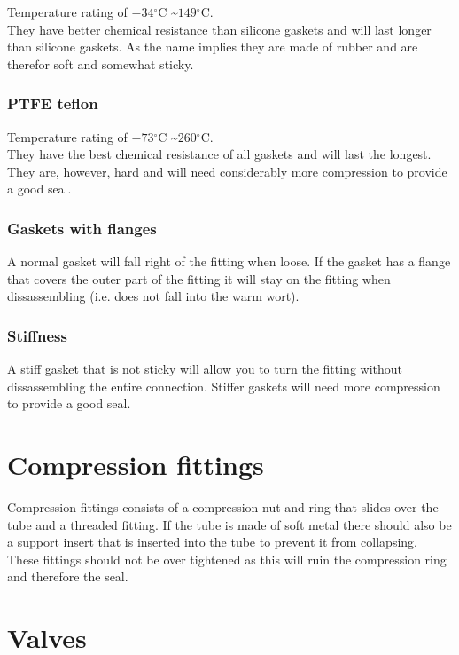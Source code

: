 \documentclass[11pt,fleqn]{book} %
\newcommand{\degree}{\ensuremath{^\circ}}
\begin{document}
Temperature rating of $-34\degree$C \textasciitilde $149\degree$C.\\
They have better chemical resistance than silicone gaskets and will last longer than silicone gaskets. As the name implies they are made of rubber and are therefor soft and somewhat sticky.

\subsubsection{PTFE teflon}

Temperature rating of $-73\degree$C \textasciitilde $260\degree$C.\\
They have the best chemical resistance of all gaskets and will last the longest. They are, however, hard and will need considerably more compression to provide a good seal.

\subsubsection{Gaskets with flanges}

A normal gasket will fall right of the fitting when loose. If the gasket has a flange that covers the outer part of the fitting it will stay on the fitting when dissassembling (i.e. does not fall into the warm wort).

\subsubsection{Stiffness}

A stiff gasket that is not sticky will allow you to turn the fitting without dissassembling the entire connection. Stiffer gaskets will need more compression to provide a good seal.

\section{Compression fittings}

Compression fittings consists of a compression nut and ring that slides over the tube and a threaded fitting. If the tube is made of soft metal there should also be a support insert that is inserted into the tube to prevent it from collapsing.\\
These fittings should not be over tightened as this will ruin the compression ring and therefore the seal.

\section{Valves}
\end{document}
